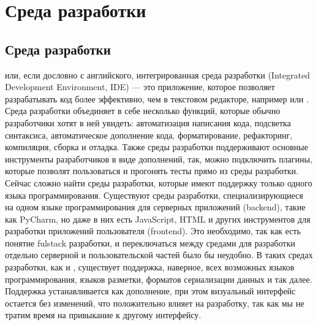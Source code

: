\documentclass[letterpaper,10pt,russian]{sphinxmanual}
\begin{document}
\chapter{Среда разработки}
\label{\detokenize{index:id5}}
\sphinxstepscope


\section{Среда разработки}
\label{\detokenize{educational_materials/ide/content:id1}}\label{\detokenize{educational_materials/ide/content::doc}}
\sphinxAtStartPar
{} или, если дословно с английского, интегрированная среда разработки (Integrated Development Environment, IDE) — это приложение, которое позволяет разрабатывать код более эффективно, чем в текстовом редакторе, например  или . Среда разработки объединяет в себе несколько функций, которые обычно разработчики хотят в ней увидеть: автоматизация написания кода, подсветка синтаксиса, автоматическое дополнение кода, форматирование, рефакторинг, компиляция, сборка и отладка. Также среды разработки поддерживают основные инструменты разработчиков в виде дополнений, так, можно подключить плагины, которые позволят пользоваться  и прогонять тесты прямо из среды разработки. Сейчас сложно найти среды разработки, которые имеют поддержку только одного языка программирования. Существуют среды разработки, специализирующиеся на одном языке программирования для серверных приложений (backend), такие как PyCharm, но даже в них есть  JavaScript, HTML и других инструментов для разработки приложений пользователя (frontend). Это необходимо, так как есть понятие fulstack разработки, и переключаться между средами для разработки отдельно серверной и пользовательской частей было бы неудобно. В таких средах разработки, как  и , существует поддержка, наверное, всех возможных языков программирования, языков разметки, форматов сериализации данных и так далее. Поддержка устанавливается как дополнение, при этом визуальный интерфейс остается без изменений, что положительно влияет на разработку, так как мы не тратим время на привыкание к другому интерфейсу.

\sphinxAtStartPar
{}
\end{document}
